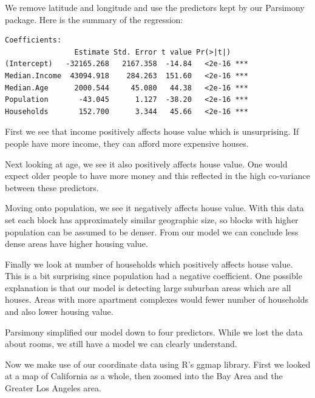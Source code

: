 \documentclass[letter]{article}
\begin{document}
We remove latitude and longitude and use the predictors kept by our Parsimony package. Here is the summary of the regression:
\begin{verbatim}
Coefficients:
                Estimate Std. Error t value Pr(>|t|)    
(Intercept)   -32165.268   2167.358  -14.84   <2e-16 ***
Median.Income  43094.918    284.263  151.60   <2e-16 ***
Median.Age      2000.544     45.080   44.38   <2e-16 ***
Population       -43.045      1.127  -38.20   <2e-16 ***
Households       152.700      3.344   45.66   <2e-16 ***
\end{verbatim}
First we see that income positively affects house value which is unsurprising. If people have more income, they can afford more expensive houses.

Next looking at age, we see it also positively affects house value. One would expect older people to have more money and this reflected in the high co-variance between these predictors.

Moving onto population, we see it negatively affects house value. With this data set each block has approximately similar geographic size, so blocks with higher population can be assumed to be denser. From our model we can conclude less dense areas have higher housing value. 

Finally we look at number of households which positively affects house value. This is a bit surprising since population had a negative coefficient. One possible explanation is that our model is detecting large suburban areas which are all houses. Areas with more apartment complexes would fewer number of households and also lower housing value.

Parsimony simplified our model down to four predictors. While we lost the data about rooms, we still have a model we can clearly understand.  

Now we make use of our coordinate data using R's ggmap library. First we looked at a map of California as a whole, then zoomed into the Bay Area and the Greater Los Angeles area.
\end{document}
